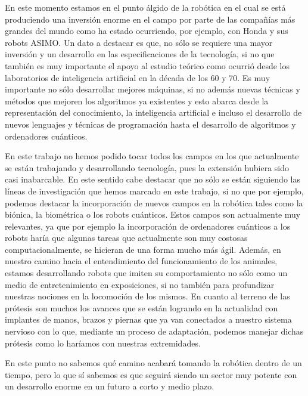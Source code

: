 \documentclass[a4paper,11pt]{article}
\begin{document}
\vspace{10px}

En este momento estamos en el punto álgido de la robótica en el cual se está produciendo una inversión enorme en el campo por parte de las compañías más grandes del mundo como ha estado ocurriendo, por ejemplo, con Honda y sus robots ASIMO. Un dato a destacar es que, no sólo se requiere una mayor inversión y un desarrollo en las especificaciones de la tecnología, si no que también es muy importante el apoyo al estudio teórico como ocurrió desde los laboratorios de inteligencia artificial en la década de los 60 y 70. Es muy importante no sólo desarrollar mejores máquinas, si no además nuevas técnicas y métodos que mejoren los algoritmos ya existentes y esto abarca desde la representación del conocimiento, la inteligencia artificial e incluso el desarrollo de nuevos lenguajes y técnicas de programación hasta el desarrollo de algoritmos y ordenadores cuánticos.

\vspace{10px}

En este trabajo no hemos podido tocar todos los campos en los que actualmente se están trabajando y desarrollando tecnología, pues la extensión hubiera sido casi inabarcable. En este sentido cabe destacar que no sólo se están siguiendo las líneas de investigación que hemos marcado en este trabajo, si no que por ejemplo, podemos destacar la incorporación de nuevos campos en la robótica tales como la biónica, la biométrica o los robots cuánticos. Estos campos son actualmente muy relevantes, ya que por ejemplo la incorporación de ordenadores cuánticos a los robots haría que algunas tareas que actualmente son muy costosas computacionalmente, se hicieran de una forma mucho más ágil. Además, en nuestro camino hacia el entendimiento del funcionamiento de los animales, estamos desarrollando robots que imiten su comportamiento no sólo como un medio de entretenimiento en exposiciones, si no también para profundizar nuestras nociones en la locomoción de los mismos. En cuanto al terreno de las prótesis son muchos los avances que se están logrando en la actualidad con implantes de manos, brazos y piernas que ya van conectados a nuestro sistema nervioso con lo que, mediante un proceso de adaptación, podemos manejar dichas prótesis como lo haríamos con nuestras extremidades. 

\vspace{10px}

En este punto no sabemos qué camino acabará tomando la robótica dentro de un tiempo, pero lo que sí sabemos es que seguirá siendo un sector muy potente con un desarrollo enorme en un futuro a corto y medio plazo.

\normalsize


\onecolumn


\nocite{*}
\end{document}
